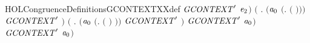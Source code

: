 \begin{SaveVerbatim}{HOLCongruenceDefinitionsGCONTEXTXXdef}
                      \ensuremath{\HOLBoundVar{GCONTEXT}\sp{\prime}} \ensuremath{\HOLBoundVar{e}\sb{\mathrm{2}}}\ensuremath{)} \HOLSymConst{\HOLTokenDisj{}}
                 \ensuremath{(}\HOLSymConst{\HOLTokenExists{}} . \ensuremath{(}\ensuremath{\HOLBoundVar{a}\sb{\mathrm{0}}} \HOLSymConst{\ensuremath{=}} \ensuremath{(}\HOLTokenLambda{}.   \ensuremath{(} \ensuremath{)}\ensuremath{)}\ensuremath{)} \HOLSymConst{\HOLTokenConj{}} \ensuremath{\HOLBoundVar{GCONTEXT}\sp{\prime}} \ensuremath{)} \HOLSymConst{\HOLTokenDisj{}}
                 \ensuremath{(}\HOLSymConst{\HOLTokenExists{}} .
                      \ensuremath{(}\ensuremath{\HOLBoundVar{a}\sb{\mathrm{0}}} \HOLSymConst{\ensuremath{=}} \ensuremath{(}\HOLTokenLambda{}.  \ensuremath{(} \ensuremath{)} \ensuremath{)}\ensuremath{)} \HOLSymConst{\HOLTokenConj{}} \ensuremath{\HOLBoundVar{GCONTEXT}\sp{\prime}} \ensuremath{)} \HOLSymConst{\HOLTokenImp{}}
                 \ensuremath{\HOLBoundVar{GCONTEXT}\sp{\prime}} \ensuremath{\HOLBoundVar{a}\sb{\mathrm{0}}}\ensuremath{)} \HOLSymConst{\HOLTokenImp{}}
            \ensuremath{\HOLBoundVar{GCONTEXT}\sp{\prime}} \ensuremath{\HOLBoundVar{a}\sb{\mathrm{0}}}\ensuremath{)}
\end{SaveVerbatim}
\newcommand{\HOLCongruenceDefinitionsGCONTEXTXXdef}{\UseVerbatim{HOLCongruenceDefinitionsGCONTEXTXXdef}}
